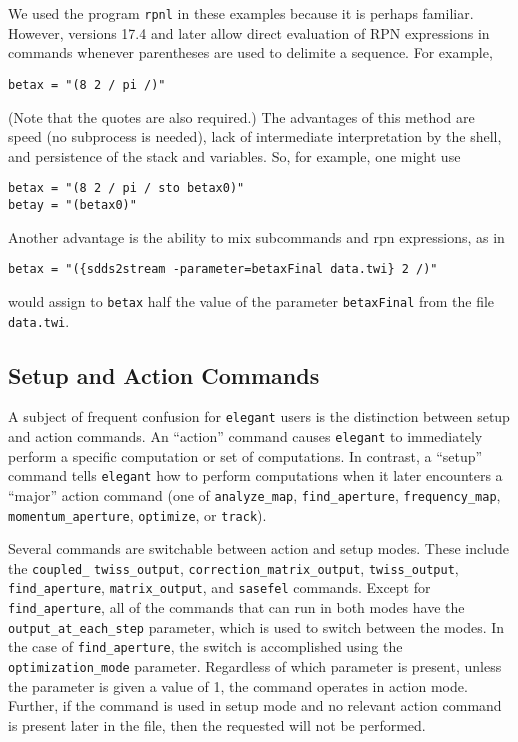 \documentclass[11pt]{article}
\begin{document}
We used the program {\tt rpnl} in these examples because it is perhaps familiar.  However, versions 17.4 and later
allow direct evaluation of RPN expressions in commands whenever parentheses are used to delimite a sequence.  For example, 
\begin{verbatim}
betax = "(8 2 / pi /)"
\end{verbatim}
(Note that the quotes are also required.)
The advantages of this method are speed (no subprocess is needed),
lack of intermediate interpretation by the shell, and persistence of
the stack and variables.  So, for example, one might use
\begin{verbatim}
betax = "(8 2 / pi / sto betax0)"
betay = "(betax0)"
\end{verbatim}
Another advantage is the ability to mix subcommands and rpn expressions, as in
\begin{verbatim}
betax = "({sdds2stream -parameter=betaxFinal data.twi} 2 /)"
\end{verbatim}
would assign to {\tt betax} half
the value of the parameter {\tt betaxFinal} from
the file {\tt data.twi}.

\subsection{Setup and Action Commands}
 
A subject of frequent confusion for {\tt elegant} users is the
distinction between setup and action commands.  An ``action'' command
causes {\tt elegant} to immediately perform a specific computation or
set of computations.  In contrast, a ``setup'' command tells {\tt elegant}
how to perform computations when it later encounters a ``major'' action
command (one of \verb|analyze_map|, \verb|find_aperture|, \verb|frequency_map|, \verb|momentum_aperture|, \verb|optimize|, 
or \verb|track|).

Several commands are switchable between action and setup modes.  These
include the \verb|coupled_| \verb|twiss_output|,
\verb|correction_matrix_output|, \verb|twiss_output|,
\verb|find_aperture|, \verb|matrix_output|, and \verb|sasefel|
commands.  Except for \verb|find_aperture|, all of the commands that
can run in both modes have the \verb|output_at_each_step| parameter,
which is used to switch between the modes.  In the case of
\verb|find_aperture|, the switch is accomplished using the
\verb|optimization_mode| parameter.  Regardless of which parameter is
present, unless the parameter is given a value of 1, the command
operates in action mode.  Further, if the command is used in setup mode
and no relevant action command is present later in the file, then the requested
will not be performed.
\end{document}
